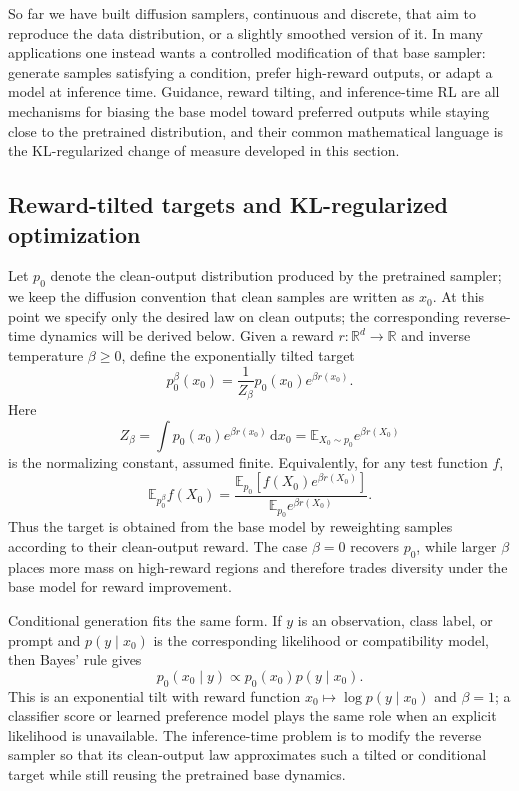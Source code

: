 \documentclass{amsart}
\numberwithin{equation}{section}
\theoremstyle{plain}
\theoremstyle{definition}
\theoremstyle{remark}
\newcommand{\R}{\mathbb{R}}
\newcommand{\E}{\mathbb{E}}
\newcommand{\dd}{\,\mathrm{d}}
\begin{document}
So far we have built diffusion samplers, continuous and discrete, that aim to
reproduce the data distribution, or a slightly smoothed version of it.  In many
applications one instead wants a controlled modification of that base sampler:
generate samples satisfying a condition, prefer high-reward outputs, or adapt a
model at inference time.  Guidance, reward tilting, and inference-time RL are all
mechanisms for biasing the base model toward preferred outputs while staying
close to the pretrained distribution, and their common mathematical language is
the KL-regularized change of measure developed in this section.

\subsection{Reward-tilted targets and KL-regularized optimization}

Let $p_0$ denote the clean-output distribution produced by the pretrained
sampler; we keep the diffusion convention that clean samples are written as
$x_0$.  At this point we specify only the desired law on clean outputs; the
corresponding reverse-time dynamics will be derived below.  Given a reward
$r:\R^d\to\R$ and inverse temperature $\beta\geq0$, define the exponentially
tilted target
\begin{equation}\label{eq:reward-tilt}
    p_0^\beta(x_0)
    =
    \frac{1}{Z_\beta}p_0(x_0)e^{\beta r(x_0)}.
\end{equation}
Here
\[
    Z_\beta=\int p_0(x_0)e^{\beta r(x_0)}\dd x_0
    =
    \E_{X_0\sim p_0}e^{\beta r(X_0)}
\]
is the normalizing constant, assumed finite.  Equivalently, for any test
function $f$,
\[
    \E_{p_0^\beta}f(X_0)
    =
    \frac{\E_{p_0}\!\left[f(X_0)e^{\beta r(X_0)}\right]}
    {\E_{p_0} e^{\beta r(X_0)}}.
\]
Thus the target is obtained from the base model by reweighting samples
according to their clean-output reward.  The case $\beta=0$ recovers $p_0$, while
larger $\beta$ places more mass on high-reward regions and therefore trades
diversity under the base model for reward improvement.

Conditional generation fits the same form.  If $y$ is an observation, class
label, or prompt and $p(y\mid x_0)$ is the corresponding likelihood or
compatibility model, then Bayes' rule gives
\[
    p_0(x_0\mid y)\propto p_0(x_0)p(y\mid x_0).
\]
This is an exponential tilt with reward function
$x_0\mapsto\log p(y\mid x_0)$ and $\beta=1$; a classifier score or learned
preference model plays the same role when an explicit likelihood is unavailable.
The inference-time problem is to modify the reverse sampler so that its
clean-output law approximates such a tilted or conditional target while still
reusing the pretrained base dynamics.
\end{document}
